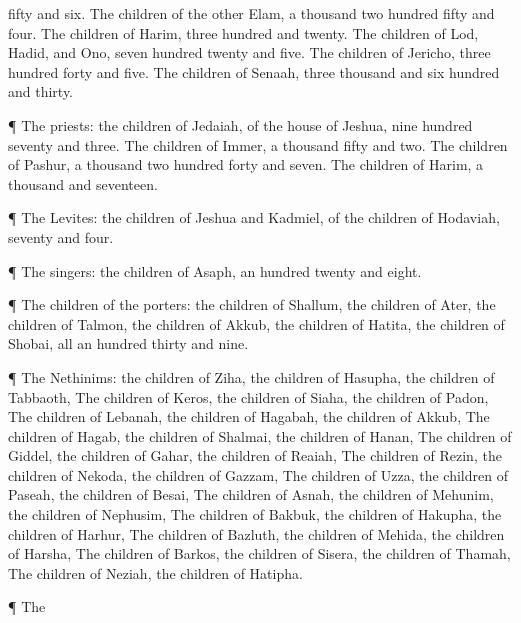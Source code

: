 {fifty and
six.
The
children of the
other
Elam, a
thousand two
hundred
fifty and
four.
The
children of
Harim,
three
hundred and
twenty.
The
children of
Lod,
Hadid, and
Ono,
seven
hundred
twenty and
five.
The
children of
Jericho,
three
hundred
forty and
five.
The
children of
Senaah,
three
thousand and
six
hundred and
thirty.
\par }{\PP {}¶ The
priests: the
children of
Jedaiah, of the
house of
Jeshua,
nine
hundred
seventy and
three.
The
children of
Immer, a
thousand
fifty and
two.
The
children of
Pashur, a
thousand two
hundred
forty and
seven.
The
children of
Harim, a
thousand and
seventeen.
\par }{\PP {}¶ The
Levites: the
children of
Jeshua and
Kadmiel, of the
children of
Hodaviah,
seventy and
four.
\par }{\PP {}¶ The
singers: the
children of
Asaph, an
hundred
twenty and
eight.
\par }{\PP {}¶ The
children of the
porters: the
children of
Shallum, the
children of
Ater, the
children of
Talmon, the
children of
Akkub, the
children of
Hatita, the
children of
Shobai,
{} all an
hundred
thirty and
nine.
\par }{\PP {}¶ The
Nethinims: the
children of
Ziha, the
children of
Hasupha, the
children of
Tabbaoth,
The
children of
Keros, the
children of
Siaha, the
children of
Padon,
The
children of
Lebanah, the
children of
Hagabah, the
children of
Akkub,
The
children of
Hagab, the
children of
Shalmai, the
children of
Hanan,
The
children of
Giddel, the
children of
Gahar, the
children of
Reaiah,
The
children of
Rezin, the
children of
Nekoda, the
children of
Gazzam,
The
children of
Uzza, the
children of
Paseah, the
children of
Besai,
The
children of
Asnah, the
children of
Mehunim, the
children of
Nephusim,
The
children of
Bakbuk, the
children of
Hakupha, the
children of
Harhur,
The
children of
Bazluth, the
children of
Mehida, the
children of
Harsha,
The
children of
Barkos, the
children of
Sisera, the
children of
Thamah,
The
children of
Neziah, the
children of
Hatipha.
\par }{\PP {}¶ The
}
